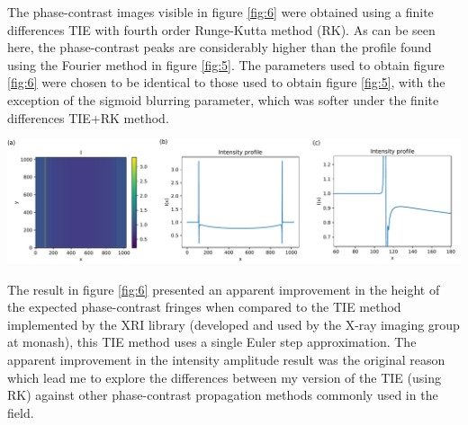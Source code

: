 \documentclass[10pt, a4paper, singlespacing]{report}
\newenvironment{Figure}
    {\par\medskip\noindent\minipage{\linewidth}}
    {\endminipage\par\medskip}
\begin{document}
The phase-contrast images visible in figure \ref{fig:6} were obtained using a finite differences TIE with fourth order Runge-Kutta method (RK). As can be seen here, the phase-contrast peaks are considerably higher than the profile found using the Fourier method in figure \ref{fig:5}. The parameters used to obtain figure \ref{fig:6} were chosen to be identical to those used to obtain figure \ref{fig:5}, with the exception of the sigmoid blurring parameter, which was softer under the finite differences TIE+RK method.
\begin{Figure} 
\centering
\includegraphics[width=\linewidth]{FD_intensity_profile.pdf}
\label{fig:6} 
\end{Figure}
The result in figure \ref{fig:6} presented an apparent improvement in the height of the expected phase-contrast fringes when compared to the TIE method implemented by the XRI library (developed and used by the X-ray imaging group at monash), this TIE method uses a single Euler step approximation. The apparent improvement in the intensity amplitude result was the original reason which lead me to explore the differences between my version of the TIE (using RK) against other phase-contrast propagation methods commonly used in the field.
\end{document}
